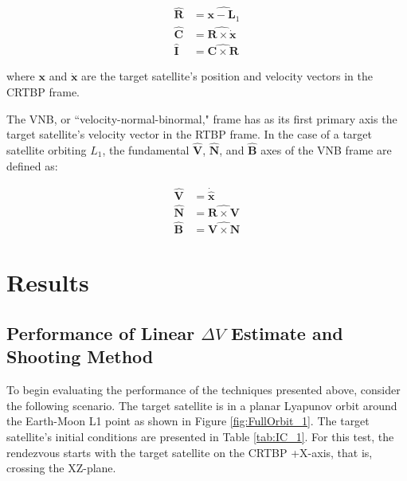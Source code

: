 \documentclass[a4paper]{article}
\begin{document}
\begin{equation} \label{eq:RIC}
\begin{aligned}
\mathbf{\hat{R}} &= \widehat{\mathbf{x} - \mathbf{L}_1} \\
\mathbf{\hat{C}} &= \widehat{\mathbf{R} \times \mathbf{\dot{x}}} \\
\mathbf{\hat{I}} \, &= \widehat{\mathbf{C} \times \mathbf{R}}
\end{aligned}
\end{equation}

where \(\mathbf{x}\) and \(\mathbf{\dot{x}}\) are the target satellite's position and velocity vectors in the CRTBP frame.

The VNB, or ``velocity-normal-binormal," frame has as its first primary axis the target satellite's velocity vector in the RTBP frame.  In the case of a target satellite orbiting \(L_1\), the fundamental \(\mathbf{\hat{V}}\), \(\mathbf{\hat{N}}\), and \(\mathbf{\hat{B}}\) axes of the VNB frame are defined as:

\begin{equation} \label{eq:VNB}
\begin{aligned}
\mathbf{\hat{V}} &= \mathbf{\dot{\hat{x}}} \\
\mathbf{\hat{N}} &= \widehat{\mathbf{R} \times \mathbf{V}}  \\
\mathbf{\hat{B}} &= \widehat{\mathbf{V} \times \mathbf{N}} 
\end{aligned}
\end{equation}

\section{Results}

\subsection{Performance of Linear \(\Delta V\) Estimate and Shooting Method}

To begin evaluating the performance of the techniques presented above, consider the following scenario.  The target satellite is in a planar Lyapunov orbit around the Earth-Moon L1 point as shown in Figure \ref{fig:FullOrbit_1}.  The target satellite's initial conditions are presented in Table \ref{tab:IC_1}.  For this test, the rendezvous starts with the target satellite on the CRTBP +X-axis, that is, crossing the XZ-plane.
\end{document}
